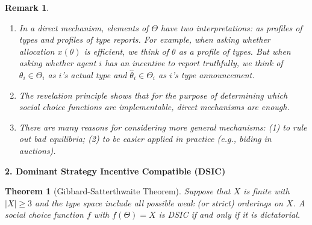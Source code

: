 \documentclass[11pt,leqno]{article}
\newtheorem{theorem}{Theorem}
\newtheorem{remark}{Remark}
\begin{document}
	\begin{remark}
		\hfill
		\begin{enumerate}
			\item In a direct mechanism, elements of $\Theta$ have two interpretations: as profiles of types and profiles of type reports. For example, when asking whether allocation $x(\theta)$ is efficient, we think of $\theta$ as a profile of types. But when asking whether agent $i$ has an incentive to report truthfully, we think of $\theta_i \in \Theta_i$ as $i$'s actual type and $\hat{\theta}_i \in \Theta_i$ as $i$'s type announcement. 
			\item The revelation principle shows that for the purpose of determining which social choice functions are implementable, direct mechanisms are enough.
			\item There are many reasons for considering more general mechanisms: (1) to rule out bad equilibria; (2) to be easier applied in practice (e.g., biding in auctions). 
		\end{enumerate}
	\end{remark}
	
	
	\textbf{2. Dominant Strategy Incentive Compatible (DSIC)}
	
	\begin{theorem}[Gibbard-Satterthwaite Theorem]
		Suppose that $X$ is finite with $|X|\ge 3$ and the type space include all possible weak (or strict) orderings on $X$. A social choice function $f$ with $f(\Theta)=X$ is DSIC if and only if it is dictatorial.
	\end{theorem}
	
\end{document}

